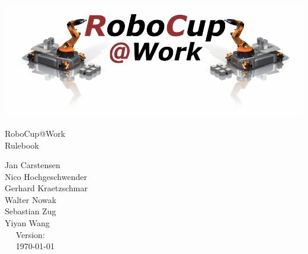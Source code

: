 \begin{titlepage}
  \begin{center}
    {
      
      \includegraphics[width=\textwidth]{images/logo_RoboCupAtWork.pdf}\\[1.23ex]
    }
    \vspace{2.7 cm}
    \hrulefill\par
    {%
      \vspace*{.27cm}
      \Huge{RoboCup@Work}\\[1.23ex]
      \Large Rulebook \\[2ex]
    }
    



    \hrulefill\par
    
    \vfill

    
	Jan Carstensen\\
	Nico Hochgeschwender\\
	Gerhard Kraetzschmar\\
	Walter Nowak\\
	Sebastian Zug\\
	Yiyan Wang\\
    
    \vfill
    ~~ Version: \YEAR ~~ \\
    ~~  \today ~~ \\
  \end{center}
\end{titlepage}
